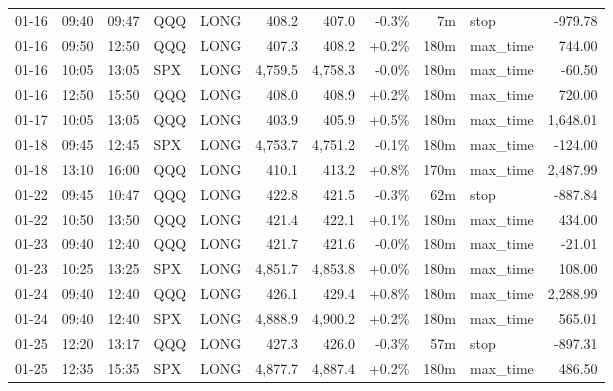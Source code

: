 \documentclass[11pt,a4paper,twoside]{article}
\begin{document}
\begin{center}
\begin{longtable}{>{\color{txtmain}}l l l l l r r r r >{\color{txtmain}}l r}
01-16 & 09:40 & 09:47 & QQQ & LONG & 408.2 & 407.0 & \textcolor{lossred}{-0.3\%} & 7m & stop & \textcolor{lossred}{-979.78} \\
01-16 & 09:50 & 12:50 & QQQ & LONG & 407.3 & 408.2 & \textcolor{wingreen}{+0.2\%} & 180m & max\_time & \textcolor{wingreen}{744.00} \\
01-16 & 10:05 & 13:05 & SPX & LONG & 4,759.5 & 4,758.3 & \textcolor{lossred}{-0.0\%} & 180m & max\_time & \textcolor{lossred}{-60.50} \\
01-16 & 12:50 & 15:50 & QQQ & LONG & 408.0 & 408.9 & \textcolor{wingreen}{+0.2\%} & 180m & max\_time & \textcolor{wingreen}{720.00} \\
01-17 & 10:05 & 13:05 & QQQ & LONG & 403.9 & 405.9 & \textcolor{wingreen}{+0.5\%} & 180m & max\_time & \textcolor{wingreen}{1,648.01} \\
01-18 & 09:45 & 12:45 & SPX & LONG & 4,753.7 & 4,751.2 & \textcolor{lossred}{-0.1\%} & 180m & max\_time & \textcolor{lossred}{-124.00} \\
01-18 & 13:10 & 16:00 & QQQ & LONG & 410.1 & 413.2 & \textcolor{wingreen}{+0.8\%} & 170m & max\_time & \textcolor{wingreen}{2,487.99} \\
01-22 & 09:45 & 10:47 & QQQ & LONG & 422.8 & 421.5 & \textcolor{lossred}{-0.3\%} & 62m & stop & \textcolor{lossred}{-887.84} \\
01-22 & 10:50 & 13:50 & QQQ & LONG & 421.4 & 422.1 & \textcolor{wingreen}{+0.1\%} & 180m & max\_time & \textcolor{wingreen}{434.00} \\
01-23 & 09:40 & 12:40 & QQQ & LONG & 421.7 & 421.6 & \textcolor{lossred}{-0.0\%} & 180m & max\_time & \textcolor{lossred}{-21.01} \\
01-23 & 10:25 & 13:25 & SPX & LONG & 4,851.7 & 4,853.8 & \textcolor{wingreen}{+0.0\%} & 180m & max\_time & \textcolor{wingreen}{108.00} \\
01-24 & 09:40 & 12:40 & QQQ & LONG & 426.1 & 429.4 & \textcolor{wingreen}{+0.8\%} & 180m & max\_time & \textcolor{wingreen}{2,288.99} \\
01-24 & 09:40 & 12:40 & SPX & LONG & 4,888.9 & 4,900.2 & \textcolor{wingreen}{+0.2\%} & 180m & max\_time & \textcolor{wingreen}{565.01} \\
01-25 & 12:20 & 13:17 & QQQ & LONG & 427.3 & 426.0 & \textcolor{lossred}{-0.3\%} & 57m & stop & \textcolor{lossred}{-897.31} \\
01-25 & 12:35 & 15:35 & SPX & LONG & 4,877.7 & 4,887.4 & \textcolor{wingreen}{+0.2\%} & 180m & max\_time & \textcolor{wingreen}{486.50} \\

\end{longtable}
\end{center}
\end{document}
